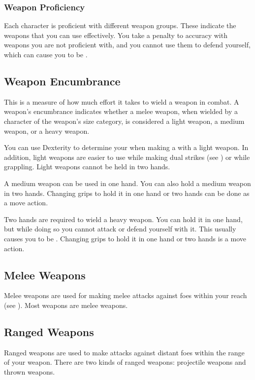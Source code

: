         \subsubsection{Weapon Proficiency}\label{Weapon Proficiency}
            Each character is proficient with different weapon groups. These indicate the weapons that you can use effectively. You take a  penalty to accuracy with weapons you are not proficient with, and you cannot use them to defend yourself, which can cause you to be .

    \subsection{Weapon Encumbrance}
        This is a measure of how much effort it takes to wield a weapon in combat. A weapon's encumbrance indicates whether a melee weapon, when wielded by a character of the weapon's size category, is considered a light weapon, a medium weapon, or a heavy weapon.

        \label{Light Weapons} You can use Dexterity to determine your  when making a  with a light weapon.
        In addition, light weapons are easier to use while making dual strikes (see ) or while grappling.
        Light weapons cannot be held in two hands.

         A medium weapon can be used in one hand. You can also hold a medium weapon in two hands. Changing grips to hold it in one hand or two hands can be done as a move action.

         Two hands are required to wield a heavy weapon. You can hold it in one hand, but while doing so you cannot attack or defend yourself with it. This usually causes you to be . Changing grips to hold it in one hand or two hands is a move action.

    \subsection{Melee Weapons}
        Melee weapons are used for making melee attacks against foes within your reach (see ). Most weapons are melee weapons.

    \subsection{Ranged Weapons}
        Ranged weapons are used to make attacks against distant foes within the range of your weapon. There are two kinds of ranged weapons: projectile weapons and thrown weapons.

